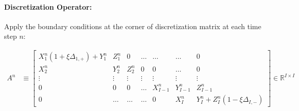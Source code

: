 \documentclass[11pt]{article}
\newcommand{\R}{\ensuremath{\mathbb{R}}}
\begin{document}

\paragraph{Discretization Operator:} Apply the boundary conditions at the corner of discretization matrix at each time step $n$:

\begin{align}
		A^n &\equiv \begin{bmatrix}
	X_{1}^n(1+\xi\Delta_{1,+})+Y_1^n & Z_1^n & 0 & \ldots & \ldots & \ldots & 0\\
	X^n_2 & Y^n_2 & Z^n_2 & 0 & 0 & \ldots & 0\\
	\vdots & \vdots & \vdots & \vdots & \vdots & \vdots & \vdots\\		
	0 & 0 & 0 & \ldots & X^n_{I-1} & Y^n_{I-1} & Z^n_{I-1}\\
	0 & \ldots & \ldots & \ldots & 0 & X_I^n & Y_I^n+Z_I^n(1-\xi\Delta_{I,-})
\end{bmatrix}\in\R^{I\times I}\label{eq:A-n}
\end{align}
\end{document}
